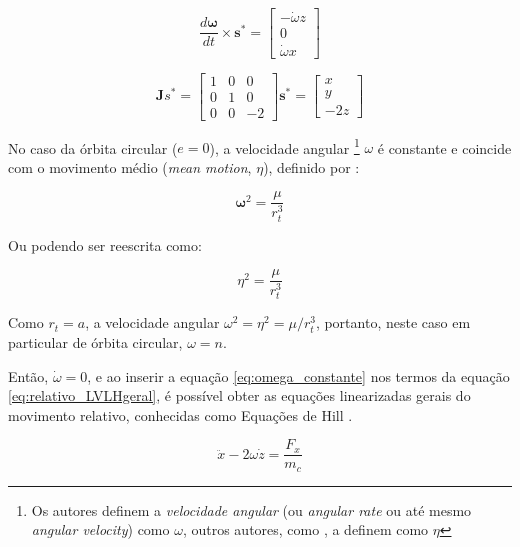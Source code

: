 \begin{equation}
\label{eq:dOmega_cross_s}
\frac{d\boldsymbol\omega}{dt} \times \boldsymbol s^* =
\begin{bmatrix}
    -\dot\omega z \\
    0              \\
    \dot\omega x
\end{bmatrix}
\end{equation}

\begin{equation}
\label{eq:jacobiana_LVLH}
\mathbf Js^* =
\begin{bmatrix}
    1 & 0 & 0 \\
    0 & 1 & 0  \\
    0 & 0 & -2
\end{bmatrix} \boldsymbol s^* =
\begin{bmatrix}
    x \\
    y \\
    -2z
\end{bmatrix}
\end{equation}

No caso da órbita circular ($e=0$), a velocidade angular
\footnote{Os autores \cite{fehse2003,sidi1997spacecraft} definem a \emph{velocidade angular} (ou \emph{angular rate} ou até mesmo \emph{angular velocity}) como $\omega$, outros autores, como \cite{bate1971}, a definem como $\eta$} 
$\omega$ é constante e coincide com o movimento médio (\emph{mean motion}, $\eta$), definido por \cite{fehse2003}:

\begin{equation}
\label{eq:omega_constante}
\boldsymbol\omega^2 = \frac{\mu}{r_t^3}
\end{equation}

Ou podendo ser reescrita como:

\begin{equation}
\label{eq:omega_constante2}
\eta^2 = \frac{\mu}{r_t^3}
\end{equation}

Como $r_t=a$, a velocidade angular $\omega^{2}= \eta^2 = \mu/r_t^{3}$, portanto, neste caso em particular de órbita circular, $\omega=n$.

Então, $\dot{\omega}=0$, e ao inserir a equação \eqref{eq:omega_constante} nos termos da equação \eqref{eq:relativo_LVLHgeral}, é possível obter as equações linearizadas gerais do movimento relativo, conhecidas como Equações de Hill \cite{hill1878,fehse2003, wie2008space}.

\begin{equation}
    \label{eq:equacoes_HillX}
\ddot{x} - 2\omega \dot{z} = \frac{F_x}{m_c}
\end{equation}


